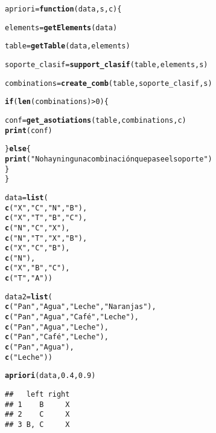 \documentclass[12pt]{report}\usepackage[]{graphicx}\usepackage[dvipsnames]{xcolor}
\makeatletter
\newcommand{\hlnum}[1]{\textcolor[rgb]{0.686,0.059,0.569}{#1}}%
\newcommand{\hlstr}[1]{\textcolor[rgb]{0.192,0.494,0.8}{#1}}%
\newcommand{\hlopt}[1]{\textcolor[rgb]{0,0,0}{#1}}%
\newcommand{\hlstd}[1]{\textcolor[rgb]{0.345,0.345,0.345}{#1}}%
\newcommand{\hlkwa}[1]{\textcolor[rgb]{0.161,0.373,0.58}{\textbf{#1}}}%
\newcommand{\hlkwb}[1]{\textcolor[rgb]{0.69,0.353,0.396}{#1}}%
\newcommand{\hlkwc}[1]{\textcolor[rgb]{0.333,0.667,0.333}{#1}}%
\newcommand{\hlkwd}[1]{\textcolor[rgb]{0.737,0.353,0.396}{\textbf{#1}}}%
\newenvironment{kframe}{%
 \def\at@end@of@kframe{}%
 \ifinner\ifhmode%
  \def\at@end@of@kframe{\end{minipage}}%
  \begin{minipage}{\columnwidth}%
 \fi\fi%
 \def\FrameCommand##1{\hskip\@totalleftmargin \hskip-\fboxsep
 \colorbox{shadecolor}{##1}\hskip-\fboxsep
     \hskip-\linewidth \hskip-\@totalleftmargin \hskip\columnwidth}%
 \MakeFramed {\advance\hsize-\width
   \@totalleftmargin\z@ \linewidth\hsize
   \@setminipage}}%
 {\par\unskip\endMakeFramed%
 \at@end@of@kframe}
\newenvironment{knitrout}{}{} %
\makeatother
\begin{document}
			
\begin{knitrout}
\color{fgcolor}\begin{kframe}
\begin{alltt}
\hlstd{apriori} \hlkwb{=} \hlkwa{function}\hlstd{(}\hlkwc{data}\hlstd{,} \hlkwc{s}\hlstd{,} \hlkwc{c}\hlstd{) \{}

        \hlstd{elements} \hlkwb{=} \hlkwd{getElements}\hlstd{(data)}

        \hlstd{table} \hlkwb{=} \hlkwd{getTable}\hlstd{(data, elements)}

        \hlstd{soporte_clasif} \hlkwb{=} \hlkwd{support_clasif}\hlstd{(table, elements, s)}

        \hlstd{combinations} \hlkwb{=} \hlkwd{create_comb}\hlstd{(table, soporte_clasif, s)}

        \hlkwa{if} \hlstd{(}\hlkwd{len}\hlstd{(combinations)} \hlopt{>} \hlnum{0}\hlstd{) \{}

                \hlstd{conf} \hlkwb{=} \hlkwd{get_asotiations}\hlstd{(table, combinations, c)}
                \hlkwd{print}\hlstd{(conf)}

        \hlstd{\}} \hlkwa{else} \hlstd{\{}
                \hlkwd{print}\hlstd{(}\hlstr{"No hay ninguna combinación que pase el soporte"}\hlstd{)}
        \hlstd{\}}
\hlstd{\}}

\hlstd{data} \hlkwb{=} \hlkwd{list}\hlstd{(}
\hlkwd{c}\hlstd{(}\hlstr{"X"}\hlstd{,} \hlstr{"C"}\hlstd{,} \hlstr{"N"}\hlstd{,} \hlstr{"B"}\hlstd{),}
\hlkwd{c}\hlstd{(}\hlstr{"X"}\hlstd{,} \hlstr{"T"}\hlstd{,} \hlstr{"B"}\hlstd{,} \hlstr{"C"}\hlstd{),}
\hlkwd{c}\hlstd{(}\hlstr{"N"}\hlstd{,} \hlstr{"C"}\hlstd{,} \hlstr{"X"}\hlstd{),}
\hlkwd{c}\hlstd{(}\hlstr{"N"}\hlstd{,} \hlstr{"T"}\hlstd{,} \hlstr{"X"}\hlstd{,} \hlstr{"B"}\hlstd{),}
\hlkwd{c}\hlstd{(}\hlstr{"X"}\hlstd{,} \hlstr{"C"}\hlstd{,} \hlstr{"B"}\hlstd{),}
\hlkwd{c}\hlstd{(}\hlstr{"N"}\hlstd{),}
\hlkwd{c}\hlstd{(}\hlstr{"X"}\hlstd{,} \hlstr{"B"}\hlstd{,} \hlstr{"C"}\hlstd{),}
\hlkwd{c}\hlstd{(}\hlstr{"T"}\hlstd{,} \hlstr{"A"}\hlstd{))}

\hlstd{data2} \hlkwb{=} \hlkwd{list}\hlstd{(}
\hlkwd{c}\hlstd{(}\hlstr{"Pan"}\hlstd{,} \hlstr{"Agua"}\hlstd{,} \hlstr{"Leche"}\hlstd{,} \hlstr{"Naranjas"}\hlstd{),}
\hlkwd{c}\hlstd{(}\hlstr{"Pan"}\hlstd{,} \hlstr{"Agua"}\hlstd{,} \hlstr{"Café"}\hlstd{,} \hlstr{"Leche"}\hlstd{),}
\hlkwd{c}\hlstd{(}\hlstr{"Pan"}\hlstd{,} \hlstr{"Agua"}\hlstd{,} \hlstr{"Leche"}\hlstd{),}
\hlkwd{c}\hlstd{(}\hlstr{"Pan"}\hlstd{,} \hlstr{"Café"}\hlstd{,} \hlstr{"Leche"}\hlstd{),}
\hlkwd{c}\hlstd{(}\hlstr{"Pan"}\hlstd{,} \hlstr{"Agua"}\hlstd{),}
\hlkwd{c}\hlstd{(}\hlstr{"Leche"}\hlstd{))}

\hlkwd{apriori}\hlstd{(data,} \hlnum{0.4}\hlstd{,} \hlnum{0.9}\hlstd{)}
\end{alltt}
\begin{verbatim}
##   left right
## 1    B     X
## 2    C     X
## 3 B, C     X
\end{verbatim}
\end{kframe}
\end{knitrout}
			
\end{document}
